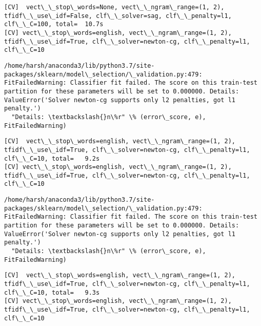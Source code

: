 \documentclass[11pt]{article}
\begin{document}
    \begin{Verbatim}[commandchars=\\\{\}]
[CV]  vect\_\_stop\_words=None, vect\_\_ngram\_range=(1, 2), tfidf\_\_use\_idf=False, clf\_\_solver=sag, clf\_\_penalty=l1, clf\_\_C=100, total=  10.7s
[CV] vect\_\_stop\_words=english, vect\_\_ngram\_range=(1, 2), tfidf\_\_use\_idf=True, clf\_\_solver=newton-cg, clf\_\_penalty=l1, clf\_\_C=10 

    \end{Verbatim}

    \begin{Verbatim}[commandchars=\\\{\}]
/home/harsh/anaconda3/lib/python3.7/site-packages/sklearn/model\_selection/\_validation.py:479: FitFailedWarning: Classifier fit failed. The score on this train-test partition for these parameters will be set to 0.000000. Details: 
ValueError('Solver newton-cg supports only l2 penalties, got l1 penalty.')
  "Details: \textbackslash{}n\%r" \% (error\_score, e), FitFailedWarning)

    \end{Verbatim}

    \begin{Verbatim}[commandchars=\\\{\}]
[CV]  vect\_\_stop\_words=english, vect\_\_ngram\_range=(1, 2), tfidf\_\_use\_idf=True, clf\_\_solver=newton-cg, clf\_\_penalty=l1, clf\_\_C=10, total=   9.2s
[CV] vect\_\_stop\_words=english, vect\_\_ngram\_range=(1, 2), tfidf\_\_use\_idf=True, clf\_\_solver=newton-cg, clf\_\_penalty=l1, clf\_\_C=10 

    \end{Verbatim}

    \begin{Verbatim}[commandchars=\\\{\}]
/home/harsh/anaconda3/lib/python3.7/site-packages/sklearn/model\_selection/\_validation.py:479: FitFailedWarning: Classifier fit failed. The score on this train-test partition for these parameters will be set to 0.000000. Details: 
ValueError('Solver newton-cg supports only l2 penalties, got l1 penalty.')
  "Details: \textbackslash{}n\%r" \% (error\_score, e), FitFailedWarning)

    \end{Verbatim}

    \begin{Verbatim}[commandchars=\\\{\}]
[CV]  vect\_\_stop\_words=english, vect\_\_ngram\_range=(1, 2), tfidf\_\_use\_idf=True, clf\_\_solver=newton-cg, clf\_\_penalty=l1, clf\_\_C=10, total=   9.3s
[CV] vect\_\_stop\_words=english, vect\_\_ngram\_range=(1, 2), tfidf\_\_use\_idf=True, clf\_\_solver=newton-cg, clf\_\_penalty=l1, clf\_\_C=10 

    \end{Verbatim}
\end{document}

